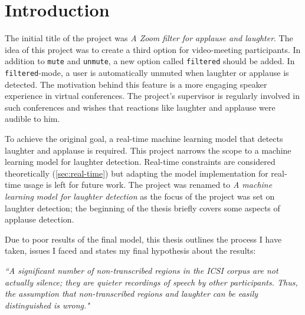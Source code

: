 \documentclass[bsc,frontabs,parskip,deptreport]{infthesis}
\begin{document}

\chapter{Introduction} \label{sec:intro}

The initial title of the project was \textit{A Zoom filter for applause and laughter}. The idea of this project was to create a third option for video-meeting participants. In addition to \texttt{mute} and \texttt{unmute}, a new option called \texttt{filtered} should be added.
In \texttt{filtered}-mode, a user is automatically unmuted when laughter or applause is detected. 
The motivation behind this feature is a more engaging speaker experience in virtual conferences. The project's supervisor is regularly involved in such conferences and wishes that reactions like laughter and applause were audible to him.

To achieve the original goal, a real-time machine learning model that detects laughter and applause is required.  
This project narrows the scope to a machine learning model for laughter detection. Real-time constraints are considered theoretically (\autoref{sec:real-time}) but adapting the model implementation for real-time usage is left for future work.
The project was renamed to \textit{A machine learning model for laughter detection} as the focus of the project was set on laughter detection; the beginning of the thesis briefly covers some aspects of applause detection. 

Due to poor results of the final model, this thesis outlines the process I have taken, issues I faced and states my final hypothesis about the results: 

\textit{``A significant number of non-transcribed regions in the ICSI corpus are not actually silence; they are quieter recordings of speech by other participants. Thus, the assumption that non-transcribed regions and laughter can be easily distinguished is wrong."}
\end{document}
